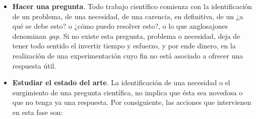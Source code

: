 \begin{itemize}
    \item \textbf{Hacer una pregunta}. Todo trabajo científico comienza con la identificación de un problema, de una necesidad, de una carencia, en definitiva, de un ¿a qué se debe esto? o ¿cómo puedo resolver esto?, o lo que anglosajones denominan \textit{gap}. Si no existe esta pregunta, problema o necesidad, deja de tener todo sentido el invertir tiempo y esfuerzo, y por ende dinero, en la realización de una experimentación cuyo fin no está asociado a ofrecer una respuesta útil.

    \item \textbf{Estudiar el estado del arte}. La identificación de una necesidad o el surgimiento de una pregunta científica, no implica que ésta sea novedosa o que no tenga ya una respuesta. Por consiguiente, las acciones que intervienen en esta fase son: 


\end{itemize}
